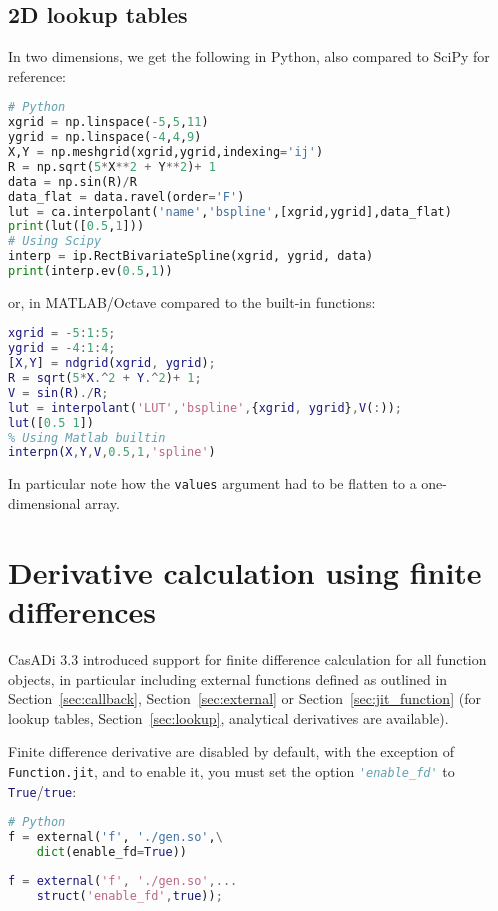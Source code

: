 \documentclass[a4paper,12pt]{book}
\newcommand{\python}[1]{\lstinline[language=Python]{#1}}
\newcommand{\matlab}[1]{\lstinline[language=Matlab]{#1}}
\begin{document}
\subsection{2D lookup tables}
In two dimensions, we get the following in Python, also compared to SciPy for reference:

\begin{lstlisting}[language=Python]
# Python
xgrid = np.linspace(-5,5,11)
ygrid = np.linspace(-4,4,9)
X,Y = np.meshgrid(xgrid,ygrid,indexing='ij')
R = np.sqrt(5*X**2 + Y**2)+ 1
data = np.sin(R)/R
data_flat = data.ravel(order='F')
lut = ca.interpolant('name','bspline',[xgrid,ygrid],data_flat)
print(lut([0.5,1]))
# Using Scipy
interp = ip.RectBivariateSpline(xgrid, ygrid, data)
print(interp.ev(0.5,1))
\end{lstlisting}

or, in MATLAB/Octave compared to the built-in functions:

\begin{lstlisting}[language=Matlab]
% MATLAB/Octave
xgrid = -5:1:5;
ygrid = -4:1:4;
[X,Y] = ndgrid(xgrid, ygrid);
R = sqrt(5*X.^2 + Y.^2)+ 1;
V = sin(R)./R;
lut = interpolant('LUT','bspline',{xgrid, ygrid},V(:));
lut([0.5 1])
% Using Matlab builtin
interpn(X,Y,V,0.5,1,'spline')
\end{lstlisting}

In particular note how the \texttt{values} argument had to be flatten to a one-dimensional array.

\section{Derivative calculation using finite differences} \label{sec:fd}
CasADi 3.3 introduced support for finite difference calculation for all function
objects, in particular including external functions defined as outlined in Section~\ref{sec:callback}, Section~\ref{sec:external} or Section~\ref{sec:jit_function}
(for lookup tables, Section~\ref{sec:lookup}, analytical derivatives are available).

Finite difference derivative are disabled by default, with the exception of \python{Function.jit}, and to enable it, you must set the option \python{'enable_fd'}
to \python{True}/\matlab{true}:

\begin{minipage}[t]{0.5\textwidth}
\begin{lstlisting}[language=Python]
# Python
f = external('f', './gen.so',\
    dict(enable_fd=True))
\end{lstlisting}
\end{minipage}
\begin{minipage}[t]{0.5\textwidth}
\begin{lstlisting}[language=Matlab]
% MATLAB/Octave
f = external('f', './gen.so',...
    struct('enable_fd',true));
\end{lstlisting}
\end{minipage}
\end{document}
